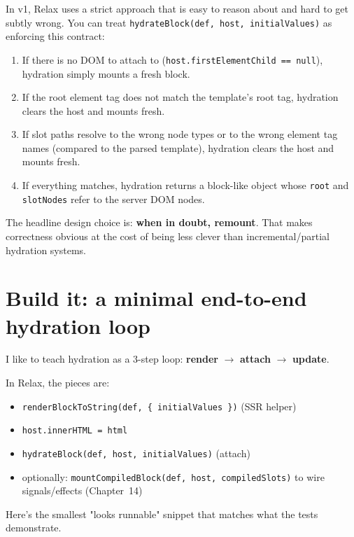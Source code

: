 In v1, Relax uses a strict approach that is easy to reason about and hard to get subtly wrong.
You can treat \texttt{hydrateBlock(def, host, initialValues)} as enforcing this contract:

\begin{enumerate}
  \item If there is no DOM to attach to (\texttt{host.firstElementChild == null}), hydration simply mounts a fresh block.
  \item If the root element tag does not match the template’s root tag, hydration clears the host and mounts fresh.
  \item If slot paths resolve to the wrong node types or to the wrong element tag names (compared to the parsed template), hydration clears the host and mounts fresh.
  \item If everything matches, hydration returns a block-like object whose \texttt{root} and \texttt{slotNodes} refer to the server DOM nodes.
\end{enumerate}

The headline design choice is: \textbf{when in doubt, remount}. That makes correctness obvious at the cost of being less clever than incremental/partial hydration systems.

\section{Build it: a minimal end-to-end hydration loop}

I like to teach hydration as a 3-step loop: \textbf{render} \(\rightarrow\) \textbf{attach} \(\rightarrow\) \textbf{update}.

In Relax, the pieces are:

\begin{itemize}
  \item \texttt{renderBlockToString(def, \{ initialValues \})} (SSR helper)
  \item \texttt{host.innerHTML = html}
  \item \texttt{hydrateBlock(def, host, initialValues)} (attach)
  \item optionally: \texttt{mountCompiledBlock(def, host, compiledSlots)} to wire signals/effects (Chapter~14)
\end{itemize}

Here’s the smallest "looks runnable" snippet that matches what the tests demonstrate.

